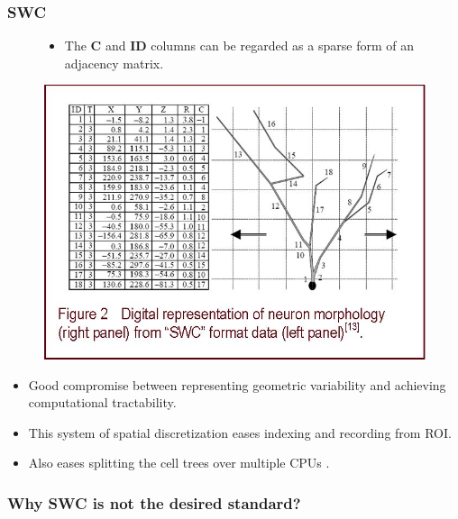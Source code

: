 \documentclass[notes=hide]{beamer}
\begin{document}
{\begin{frame}
\frametitle{SWC}
\begin{figure}
\begin{itemize}
\item The \textbf{C} and \textbf{ID} columns can be regarded as a sparse form of an adjacency matrix.
\end{itemize}
\vfill
\includegraphics[scale=1.05]{NeuralRegenRes_2012_7_21_1637_128269_2.jpg}
\end{figure}
\cite{rahim2012curve}
\end{frame}


\begin{frame}
\begin{itemize}
\frametitle{Why is SWC so popular?}

\item Good compromise between representing geometric variability and achieving computational tractability.
\vfill
\item This system of spatial discretization eases indexing and recording from ROI.
\vfill
\item Also eases splitting the cell trees over multiple CPUs
\cite{eichner2009neural}.
\vfill
\end{itemize}
\end{frame}
\begin{frame}
\frametitle{Why SWC is not the desired standard?}


\end{frame}}
\end{document}
